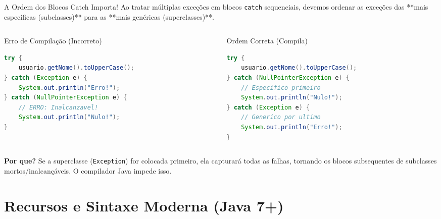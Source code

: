 \documentclass[9pt]{beamer}
\begin{document}
\begin{frame}[fragile]{A Ordem dos Blocos Catch Importa!}
    Ao tratar múltiplas exceções em blocos \texttt{catch} sequenciais, devemos ordenar as exceções das **mais específicas (subclasses)** para as **mais genéricas (superclasses)**.
    
    \vspace{0.15cm}
    
    \begin{columns}[t]
        \begin{column}{0.48\textwidth}
            \begin{block}{Erro de Compilação (Incorreto)}
                \begin{lstlisting}[language=Java,numbers=none]
try {
    usuario.getNome().toUpperCase();
} catch (Exception e) {
    System.out.println("Erro!");
} catch (NullPointerException e) {
    // ERRO: Inalcanzavel!
    System.out.println("Nulo!");
}
\end{lstlisting}
            \end{block}
        \end{column}
        
        \begin{column}{0.48\textwidth}
            \begin{block}{Ordem Correta (Compila)}
                \begin{lstlisting}[language=Java,numbers=none]
try {
    usuario.getNome().toUpperCase();
} catch (NullPointerException e) {
    // Especifico primeiro
    System.out.println("Nulo!");
} catch (Exception e) {
    // Generico por ultimo
    System.out.println("Erro!");
}
\end{lstlisting}
            \end{block}
        \end{column}
    \end{columns}
    
    \vspace{0.15cm}
    \centering\scriptsize
    \textbf{Por que?} Se a superclasse (\texttt{Exception}) for colocada primeiro, ela capturará todas as falhas, tornando os blocos subsequentes de subclasses mortos/inalcançáveis. O compilador Java impede isso.
\end{frame}

\section{Recursos e Sintaxe Moderna (Java 7+)}
\end{document}
